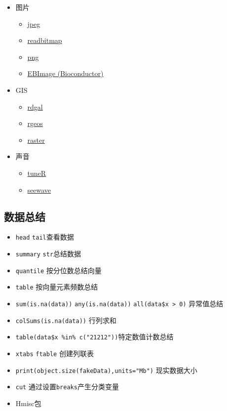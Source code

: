 \documentclass[]{book}
\providecommand{\tightlist}{%
  \setlength{\itemsep}{0pt}\setlength{\parskip}{0pt}}
\begin{document}
\begin{itemize}
\tightlist
\item
  图片

  \begin{itemize}
  \tightlist
  \item
    \href{http://cran.r-project.org/web/packages/jpeg/index.html}{jpeg}
  \item
    \href{http://cran.r-project.org/web/packages/readbitmap/index.html}{readbitmap}
  \item
    \href{http://cran.r-project.org/web/packages/png/index.html}{png}
  \item
    \href{http://www.bioconductor.org/packages/2.13/bioc/html/EBImage.html}{EBImage (Bioconductor)}
  \end{itemize}
\item
  GIS

  \begin{itemize}
  \tightlist
  \item
    \href{http://cran.r-project.org/web/packages/rgdal/index.html}{rdgal}
  \item
    \href{http://cran.r-project.org/web/packages/rgeos/index.html}{rgeos}
  \item
    \href{http://cran.r-project.org/web/packages/raster/index.html}{raster}
  \end{itemize}
\item
  声音

  \begin{itemize}
  \tightlist
  \item
    \href{http://cran.r-project.org/web/packages/tuneR/}{tuneR}
  \item
    \href{http://rug.mnhn.fr/seewave/}{seewave}
  \end{itemize}
\end{itemize}

\subsection{数据总结}

\begin{itemize}
\tightlist
\item
  \texttt{head} \texttt{tail}查看数据
\item
  \texttt{summary} \texttt{str}总结数据
\item
  \texttt{quantile} 按分位数总结向量
\item
  \texttt{table} 按向量元素频数总结
\item
  \texttt{sum(is.na(data))} \texttt{any(is.na(data))} \texttt{all(data\$x\ \textgreater{}\ 0)} 异常值总结
\item
  \texttt{colSums(is.na(data))} 行列求和
\item
  \texttt{table(data\$x\ \%in\%\ c("21212"))}特定数值计数总结
\item
  \texttt{xtabs} \texttt{ftable} 创建列联表
\item
  \texttt{print(object.size(fakeData),units="Mb")} 现实数据大小
\item
  \texttt{cut} 通过设置\texttt{breaks}产生分类变量
\item
  Hmisc包
\end{itemize}
\end{document}
